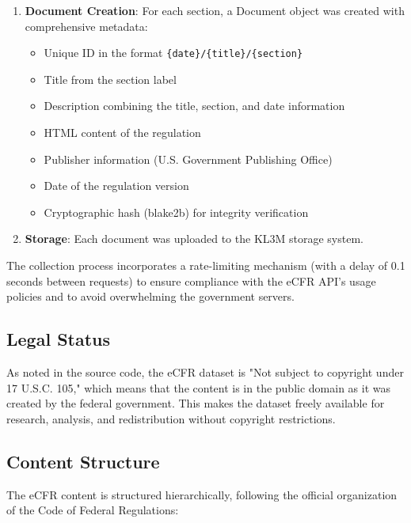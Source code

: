 \begin{enumerate}
  \item \textbf{Document Creation}: For each section, a Document object was created with comprehensive metadata:
  \begin{itemize}
    \item Unique ID in the format \verb|{date}/{title}/{section}|
    \item Title from the section label
    \item Description combining the title, section, and date information
    \item HTML content of the regulation
    \item Publisher information (U.S. Government Publishing Office)
    \item Date of the regulation version
    \item Cryptographic hash (blake2b) for integrity verification
  \end{itemize}
  
  \item \textbf{Storage}: Each document was uploaded to the KL3M storage system.
\end{enumerate}

The collection process incorporates a rate-limiting mechanism (with a delay of 0.1 seconds between requests) to ensure compliance with the eCFR API's usage policies and to avoid overwhelming the government servers.

\subsection{Legal Status}

As noted in the source code, the eCFR dataset is "Not subject to copyright under 17 U.S.C. 105," which means that the content is in the public domain as it was created by the federal government. This makes the dataset freely available for research, analysis, and redistribution without copyright restrictions.

\subsection{Content Structure}

The eCFR content is structured hierarchically, following the official organization of the Code of Federal Regulations:

